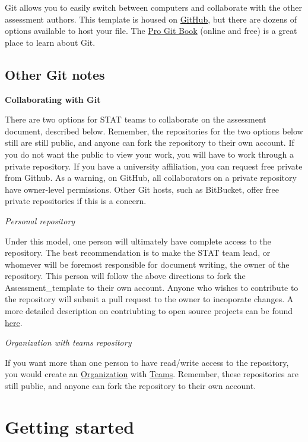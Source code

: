 \documentclass[12pt,]{article}
\begin{document}
Git allows you to easily switch between computers and collaborate with
the other assessment authors. This template is housed on
\href{https://github.com/}{GitHub}, but there are dozens of options
available to host your file. The
\href{http://git-scm.com/book/en/v2}{Pro Git Book} (online and free) is
a great place to learn about Git.

\subsection{Other Git notes}\label{other-git-notes}

\textbf{Collaborating with Git}

There are two options for STAT teams to collaborate on the assessment
document, described below. Remember, the repositories for the two
options below still are still public, and anyone can fork the repository
to their own account. If you do not want the public to view your work,
you will have to work through a private repository. If you have a
university affiliation, you can request free private from Github. As a
warning, on GitHub, all collaborators on a private repository have
owner-level permissions. Other Git hosts, such as BitBucket, offer free
private repositories if this is a concern.

\emph{Personal repository}

Under this model, one person will ultimately have complete access to the
repository. The best recommendation is to make the STAT team lead, or
whomever will be foremost responsible for document writing, the owner of
the repository. This person will follow the above directions to fork the
Assessment\_template to their own account. Anyone who wishes to
contribute to the repository will submit a pull request to the owner to
incoporate changes. A more detailed description on contriubting to open
source projects can be found
\href{https://guides.github.com/activities/contributing-to-open-source/}{here}.

\emph{Organization with teams repository}

If you want more than one person to have read/write access to the
repository, you would create an
\href{https://help.github.com/articles/creating-a-new-organization-account/}{Organization}
with
\href{https://help.github.com/articles/permission-levels-for-an-organization-repository/}{Teams}.
Remember, these repositories are still public, and anyone can fork the
repository to their own account.

\section{Getting started}\label{getting-started}
\end{document}
